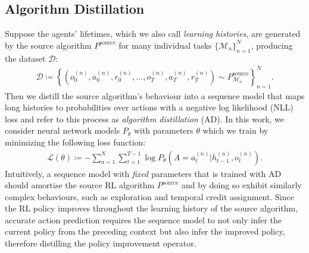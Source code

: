 \documentclass{article}
\theoremstyle{thm}
\newcommand{\defeq}{\coloneqq}
\newcommand{\algo}{\ensuremath{P}}
\begin{document}
\subsection{Algorithm Distillation}
\label{subsec:algorithm-distillation}
Suppose the agents' lifetimes, which we also call {\it learning histories}, are generated by the source algorithm $\algo^{\text{source}}$ for many individual tasks $\{ \mathcal{M}_{n} \}_{n=1}^{N}$, producing the dataset $\mathcal{D}$:
\begin{align}
  \mathcal{D} \defeq \left\{ \left( o_{0}^{(n)}, a_{0}^{(n)}, r_{0}^{(n)}, \ldots, o_{T}^{(n)}, a_{T}^{(n)}, r_{T}^{(n)} \right) \sim \algo_{\mathcal{M}_{n}}^{\text{source}} \right\}_{n=1}^{N}.
  \label{eq:data}
\end{align}
Then we distill the source algorithm's behaviour into a sequence model that maps long histories to probabilities over actions with a negative log likelihood (NLL) loss and refer to this process as \emph{algorithm distillation} (AD).
In this work, we consider neural network models $\algo_{\theta}$ with parameters $\theta$ which we train by minimizing the following loss function:
\begin{align}
   \mathcal L(\theta) \defeq  -\sum_{n=1}^{N} \sum_{t=1}^{T-1} \log \algo_{\theta}(A=a_{t}^{(n)} \vert h_{t-1}^{(n)}, o_t^{(n)}).
\label{eq:thetastar}
\end{align}
Intuitively, a sequence model with \emph{fixed} parameters that is trained with AD should amortise the source RL algorithm $\algo^{\text{source}}$ and by doing so exhibit similarly complex behaviours, such as exploration and temporal credit assignment. Since the RL policy improves throughout the learning history of the source algorithm, accurate action prediction requires the sequence model to not only infer the current policy from the preceding context but also infer the improved policy, therefore distilling the policy improvement operator.
\end{document}
